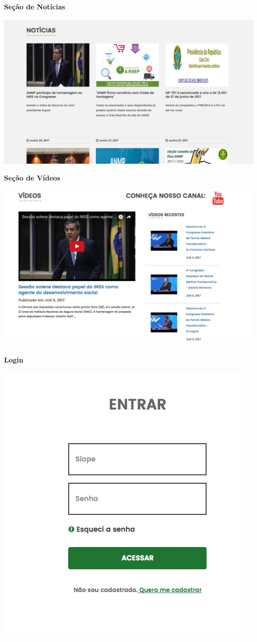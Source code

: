 \textbf{Seção de Notícias}

\includegraphics[keepaspectratio=true,scale=0.3]{figuras/noticias.png}

\textbf{Seção de Vídeos}

\includegraphics[keepaspectratio=true,scale=0.3]{figuras/videos.png}

\textbf{Login}

\includegraphics[keepaspectratio=true,scale=0.3]{figuras/login.png}

